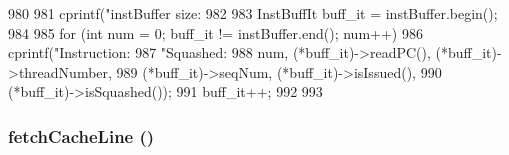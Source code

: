 \begin{DoxyCode}
980 {
981     cprintf("instBuffer size: %
982 
983     InstBuffIt buff_it = instBuffer.begin();
984 
985     for (int num = 0; buff_it != instBuffer.end(); num++) {
986         cprintf("Instruction:%
987                 "Squashed:%
988                 num, (*buff_it)->readPC(), (*buff_it)->threadNumber,
989                 (*buff_it)->seqNum, (*buff_it)->isIssued(),
990                 (*buff_it)->isSquashed());
991         buff_it++;
992     }
993 }
\end{DoxyCode}
\hypertarget{classFrontEnd_abc6f8ec144effb7168fdfdfc9661b884}{
\subsubsection[{fetchCacheLine}]{ fetchCacheLine ()}}
\label{classFrontEnd_abc6f8ec144effb7168fdfdfc9661b884}



